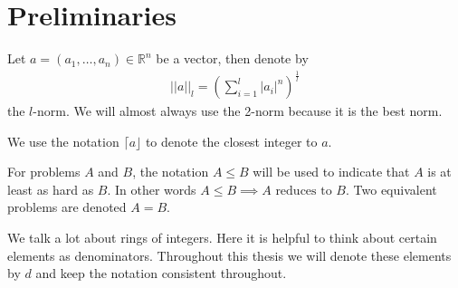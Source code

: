 \section{Preliminaries}
\label{Section:Preliminaries}
Let \(a = (a_1,\dots ,a_n) \in\mathbb{R}^n\) be a vector, then denote by
\begin{align*}
    ||a||_l = \left(\sum\limits_{i = 1}^l |a_i|^n\right)^\frac{1}{l}
\end{align*}
the \(l\)-norm. We will almost always use the 2-norm because it is the best norm.\par
We use the notation \(\lceil a\rfloor\) to denote the closest integer to \(a\).\par
For problems \(A\) and \(B\), the notation \(A\leq B\) will be used to indicate that \(A\) is at least as hard as \(B\). In other words \(A\leq B\implies A \text{ reduces to }B\). Two equivalent problems are denoted \(A=B\). \par
We talk a lot about rings of integers. Here it is helpful to think about certain elements as denominators. Throughout this thesis we will denote these elements by \(d\) and keep the notation consistent throughout.